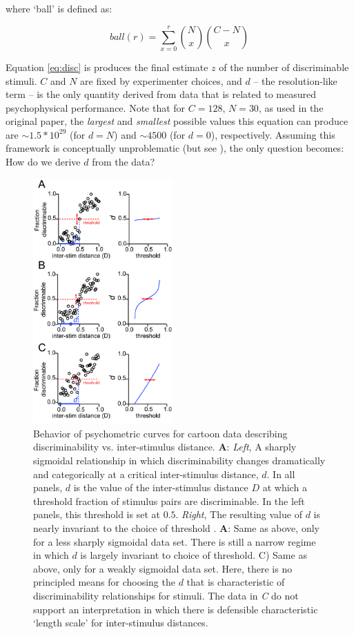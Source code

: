 \documentclass[letterpaper,twocolumn,10pt]{article}
\begin{document}
where `ball' is defined as: 

\begin{equation}
\label{eq:ball}
ball(r) = \sum_{x=0}^{r} \binom{N}{x}\binom{C-N}{x}
\end{equation} 

Equation \ref{eq:disc} is produces the final estimate $z$ of the number of discriminable stimuli. 
$C$ and $N$ are fixed by experimenter choices, 
and $d$ -- the resolution-like term -- is the only quantity derived from data that is related to measured psychophysical performance. 
Note that for $C=128$, $N=30$, as used in the original paper, the \textit{largest} and \textit{smallest} possible values this equation can produce are $\sim 1.5 * 10^{29}$ (for $d=N$) and $\sim 4500$ (for $d=0$), respectively.  
Assuming this framework is conceptually unproblematic (but see \cite{meister_can_2014}), 
the only question becomes: How do we derive $d$ from the data? 

\begin{figure}[!hbt]
    \centering
    \includegraphics[width=0.475\textwidth]{figures/Fig5_Sigmoids}
    \caption{
Behavior of psychometric curves for cartoon data describing discriminability vs. inter-stimulus distance. 
\textbf{A}: \textit{Left}, A sharply sigmoidal relationship in which 
discriminability changes dramatically and categorically at a critical inter-stimulus distance, $d$. In all panels, $d$ is the value of the inter-stimulus distance $D$ at which a threshold fraction of stimulus pairs are discriminable.  In the left panels, this threshold is set at $0.5$.
\textit{Right}, The resulting value of $d$ is nearly invariant to the choice of threshold . 
\textbf{A}: Same as above, only for a less sharply sigmoidal data set. 
There is still a narrow regime in which $d$ is largely invariant to choice of threshold. 
C) Same as above, only for a weakly sigmoidal data set. 
Here, there is no principled means for choosing the $d$ that is characteristic of discriminability relationships for stimuli. 
The data in \textit{C} do not support an interpretation in which 
there is defensible characteristic `length scale' for inter-stimulus distances.}
    \label{fig:sigmoids}
\end{figure}
\end{document}
